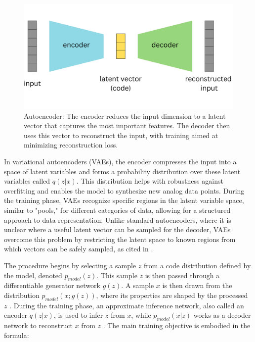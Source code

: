 \begin{figure}[ht]
    \centering
      \hspace{.8cm}
      \includegraphics[width=.7\columnwidth]{figures/Autoencoder.png}
      \caption{Autoencoder: The encoder reduces the input dimension to a latent vector that captures the most important features. The decoder then uses this vector to reconstruct the input, with training aimed at minimizing reconstruction loss.}
      \label{fig:figureAE}
    \end{figure}


In variational autoencoders (VAEs), the encoder compresses the input into a space of latent variables and forms a probability distribution over these latent variables called \( q(z|x) \). This distribution helps with robustness against overfitting and enables the model to synthesize new analog data points. During the training phase, VAEs recognize specific regions in the latent variable space, similar to "pools," for different categories of data, allowing for a structured approach to data representation. Unlike standard autoencoders, where it is unclear where a useful latent vector can be sampled for the decoder, VAEs overcome this problem by restricting the latent space to known regions from which vectors can be safely sampled, as cited in \citep{doerschVAE}.

The procedure begins by selecting a sample \( z \) from a code distribution defined by the model, denoted \( p_{model}(z) \). This sample \( z \) is then passed through a differentiable generator network \( g(z) \). A sample \( x \) is then drawn from the distribution \( p_{model}(x; g(z)) \), where its properties are shaped by the processed \( z \) \citep{GoodfellowDeepLearning}. During the training phase, an approximate inference network, also called an encoder \( q(z|x) \), is used to infer \( z \) from \( x \), while \( p_{model}(x|z) \) works as a decoder network to reconstruct \( x \) from \( z \) \citep{GoodfellowDeepLearning}. The main training objective is embodied in the formula:
        
